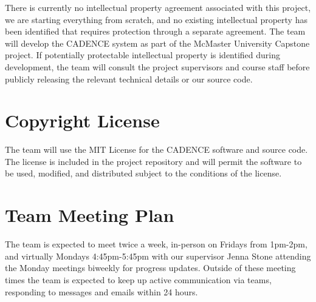 \documentclass{article}
\begin{document}
There is currently no intellectual property agreement associated with this project, we are starting everything from scratch, and no existing intellectual property has been identified that requires protection through a separate agreement. The team will develop the CADENCE system as part of the McMaster University Capstone project. 
If potentially protectable intellectual property is identified during development, the team will consult the project supervisors and course staff before publicly releasing the relevant technical details or our source code.

\section{Copyright License}

The team will use the MIT License for the CADENCE software and source code. The license is included in the project repository and will permit the software to be used, modified, and distributed subject to the conditions of the license.

\section{Team Meeting Plan}







The team is expected to meet twice a week, in-person on Fridays from 1pm-2pm, and virtually Mondays 4:45pm-5:45pm with our supervisor Jenna Stone attending the Monday meetings biweekly for progress updates. Outside of these meeting times the team is expected to keep up active communication via teams, responding to messages and emails within 24 hours. 
\end{document}
